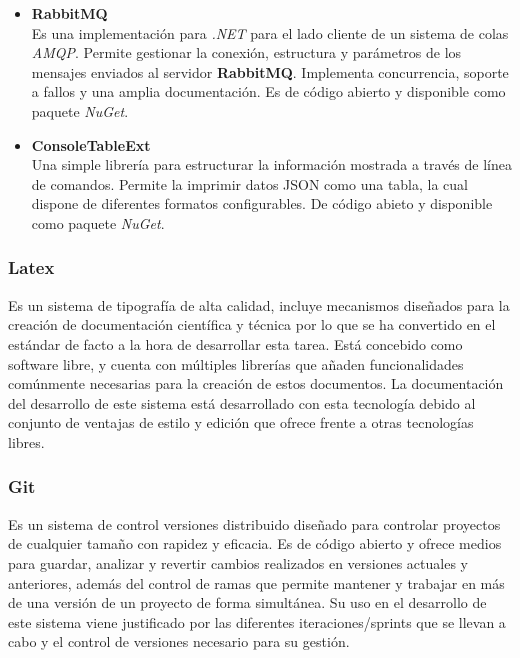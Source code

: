\begin{itemize}
                \item \textbf{RabbitMQ} \\
                    Es una implementación para \textit{.NET} para el lado cliente de un sistema de colas \textit{AMQP}. Permite gestionar la conexión, estructura y parámetros de los mensajes enviados al servidor \textbf{RabbitMQ}. Implementa concurrencia, soporte a fallos y una amplia documentación. Es de código abierto y disponible como paquete \textit{NuGet}. \cite{rabbitmq}
                \item \textbf{ConsoleTableExt} \\
                    Una simple librería para estructurar la información mostrada a través de línea de comandos. Permite la imprimir datos JSON como una tabla, la cual dispone de diferentes formatos configurables. De código abieto y disponible como paquete \textit{NuGet}. \cite{consoletableext}
            \end{itemize}
            
        \subsubsection{Latex}
            Es un sistema de tipografía de alta calidad, incluye mecanismos diseñados para la creación de documentación científica y técnica por lo que se ha convertido en el estándar de facto a la hora de desarrollar esta tarea. Está concebido como software libre, y cuenta con múltiples librerías que añaden funcionalidades comúnmente necesarias para la creación de estos documentos. La documentación del desarrollo de este sistema está desarrollado con esta tecnología debido al conjunto de ventajas de estilo y edición que ofrece frente a otras tecnologías libres.

        \subsubsection{Git}
            Es un sistema de control versiones distribuido diseñado para controlar proyectos de cualquier tamaño con rapidez y eficacia. Es de código abierto y ofrece medios para guardar, analizar y revertir cambios realizados en versiones actuales y anteriores, además del control de ramas que permite mantener y trabajar en más de una versión de un proyecto de forma simultánea. Su uso en el desarrollo de este sistema viene justificado por las diferentes iteraciones/sprints que se llevan a cabo y el control de versiones necesario para su gestión.
            
